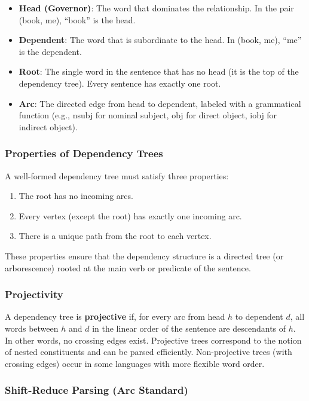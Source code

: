 \documentclass[11pt,a4paper]{article}
\begin{document}
\begin{itemize}
    \item \textbf{Head (Governor)}: The word that dominates the relationship. In the pair (book, me), ``book'' is the head.
    \item \textbf{Dependent}: The word that is subordinate to the head. In (book, me), ``me'' is the dependent.
    \item \textbf{Root}: The single word in the sentence that has no head (it is the top of the dependency tree). Every sentence has exactly one root.
    \item \textbf{Arc}: The directed edge from head to dependent, labeled with a grammatical function (e.g., nsubj for nominal subject, obj for direct object, iobj for indirect object).
\end{itemize}

\subsubsection{Properties of Dependency Trees}

A well-formed dependency tree must satisfy three properties:
\begin{enumerate}
    \item The root has no incoming arcs.
    \item Every vertex (except the root) has exactly one incoming arc.
    \item There is a unique path from the root to each vertex.
\end{enumerate}

These properties ensure that the dependency structure is a directed tree (or arborescence) rooted at the main verb or predicate of the sentence.

\subsubsection{Projectivity}

A dependency tree is \textbf{projective} if, for every arc from head $h$ to dependent $d$, all words between $h$ and $d$ in the linear order of the sentence are descendants of $h$. In other words, no crossing edges exist. Projective trees correspond to the notion of nested constituents and can be parsed efficiently. Non-projective trees (with crossing edges) occur in some languages with more flexible word order.

\subsubsection{Shift-Reduce Parsing (Arc Standard)}
\end{document}

